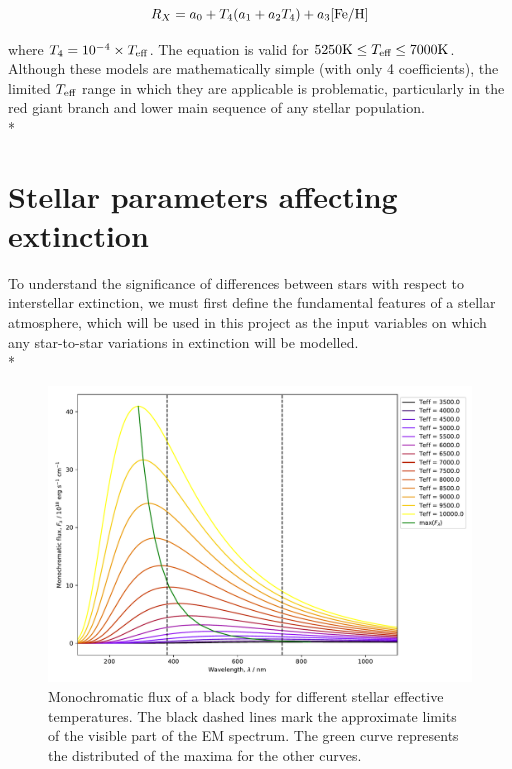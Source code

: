 \documentclass[12pt, a4paper]{report}
\begin{document}
\begin{equation}
R_{X} = a_{0} + T_{4}(a_{1} + a_{2}T_{4}) + a_{3}\textnormal{[Fe/H]}
\label{casagrande_ext_fit}
\end{equation}

where $T_{4} = 10^{-4} \times T_{\textnormal{eff}}$. The equation is valid for $5250\textnormal{K} \leq T_{\textnormal{eff}} \leq 7000\textnormal{K}$. Although these models are mathematically simple (with only 4 coefficients), the limited $T_{\textnormal{eff}}$ range in which they are applicable is problematic, particularly in the red giant branch and lower main sequence of any stellar population.\\*

\section{Stellar parameters affecting extinction} \label{params}
To understand the significance of differences between stars with respect to interstellar extinction, we must first define the fundamental features of a stellar atmosphere, which will be used in this project as the input variables on which any star-to-star variations in extinction will be modelled. \\*

\begin{figure}[h]
\begin{center}
\includegraphics[scale=0.5]{blackbody_teff_illustration.pdf}
\caption{Monochromatic flux of a black body for different stellar effective temperatures. The black dashed lines mark the approximate limits of the visible part of the EM spectrum. The green curve represents the distributed of the maxima for the other curves.}
\label{planck_curve}
\end{center}
\end{figure}
\end{document}
